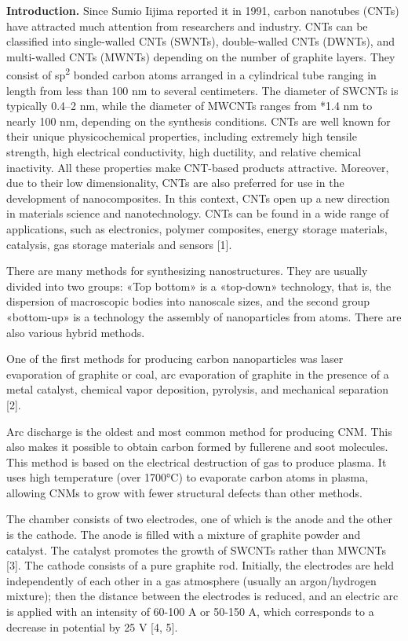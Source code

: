 \begin{multicols}{2}
{\bfseries Introduction.} Since Sumio Iijima reported it in 1991, carbon
nanotubes (CNTs) have attracted much attention from researchers and
industry. CNTs can be classified into single-walled CNTs (SWNTs),
double-walled CNTs (DWNTs), and multi-walled CNTs (MWNTs) depending on
the number of graphite layers. They consist of sp\textsuperscript{2}
bonded carbon atoms arranged in a cylindrical tube ranging in length
from less than 100 nm to several centimeters. The diameter of SWCNTs is
typically 0.4--2 nm, while the diameter of MWCNTs ranges from *1.4 nm to
nearly 100 nm, depending on the synthesis conditions. CNTs are well
known for their unique physicochemical properties, including extremely
high tensile strength, high electrical conductivity, high ductility, and
relative chemical inactivity. All these properties make CNT-based
products attractive. Moreover, due to their low dimensionality, CNTs are
also preferred for use in the development of nanocomposites. In this
context, CNTs open up a new direction in materials science and
nanotechnology. CNTs can be found in a wide range of applications, such
as electronics, polymer composites, energy storage materials, catalysis,
gas storage materials and sensors {[}1{]}.

There are many methods for synthesizing nanostructures. They are usually
divided into two groups: «Top bottom» is a «top-down» technology, that
is, the dispersion of macroscopic bodies into nanoscale sizes, and the
second group «bottom-up» is a technology the assembly of nanoparticles
from atoms. There are also various hybrid methods.

One of the first methods for producing carbon nanoparticles was laser
evaporation of graphite or coal, arc evaporation of graphite in the
presence of a metal catalyst, chemical vapor deposition, pyrolysis, and
mechanical separation {[}2{]}.

Arc discharge is the oldest and most common method for producing CNM.
This also makes it possible to obtain carbon formed by fullerene and
soot molecules. This method is based on the electrical destruction of
gas to produce plasma. It uses high temperature (over 1700°C) to
evaporate carbon atoms in plasma, allowing CNMs to grow with fewer
structural defects than other methods.

The chamber consists of two electrodes, one of which is the anode and
the other is the cathode. The anode is filled with a mixture of graphite
powder and catalyst. The catalyst promotes the growth of SWCNTs rather
than MWCNTs {[}3{]}. The cathode consists of a pure graphite rod.
Initially, the electrodes are held independently of each other in a gas
atmosphere (usually an argon/hydrogen mixture); then the distance
between the electrodes is reduced, and an electric arc is applied with
an intensity of 60-100 A or 50-150 A, which corresponds to a decrease in
potential by 25 V {[}4, 5{]}.


\end{multicols}
